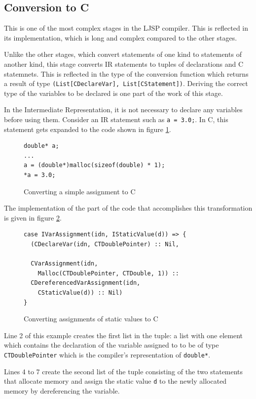 \documentclass[11pt]{report}
\begin{document}
\subsection{Conversion to C}
This is one of the most complex stages in the LJSP compiler. This is reflected in its implementation, which is long and complex compared to the other stages.

Unlike the other stages, which convert statements of one kind to statements of another kind, this stage converts IR statements to tuples of declarations and C statemnets. This is reflected in the type of the conversion function which returns a result of type \texttt{(List[CDeclareVar], List[CStatement])}. Deriving the correct type of the variables to be declared is one part of the work of this stage.

In the Intermediate Representation, it is not necessary to declare any variables before using them. Consider an IR statement such as \texttt{a = 3.0;}. In C, this statement gets expanded to the code shown in figure \ref{iconvc1}.
\begin{figure}[ht]
\begin{lstlisting}
double* a;
...
a = (double*)malloc(sizeof(double) * 1);
*a = 3.0;
\end{lstlisting}
\caption{Converting a simple assignment to C}
\label{iconvc1}
\end{figure}

The implementation of the part of the code that accomplishes this transformation is given in figure \ref{iconvc2}.

\begin{figure}[ht]
\begin{lstlisting}
case IVarAssignment(idn, IStaticValue(d)) => {
  (CDeclareVar(idn, CTDoublePointer) :: Nil,
  
  CVarAssignment(idn, 
    Malloc(CTDoublePointer, CTDouble, 1)) ::
  CDereferencedVarAssignment(idn, 
    CStaticValue(d)) :: Nil)
}
\end{lstlisting}
\caption{Converting assignments of static values to C}
\label{iconvc2}
\end{figure}

Line 2 of this example creates the first list in the tuple: a list with one element which contains the declaration of the variable assigned to to be of type \texttt{CTDoublePointer} which is the compiler's representation of \texttt{double*}.

Lines 4 to 7 create the second list of the tuple consisting of the two statements that allocate memory and assign the static value \texttt{d} to the newly allocated memory by dereferencing the variable.
\end{document}

